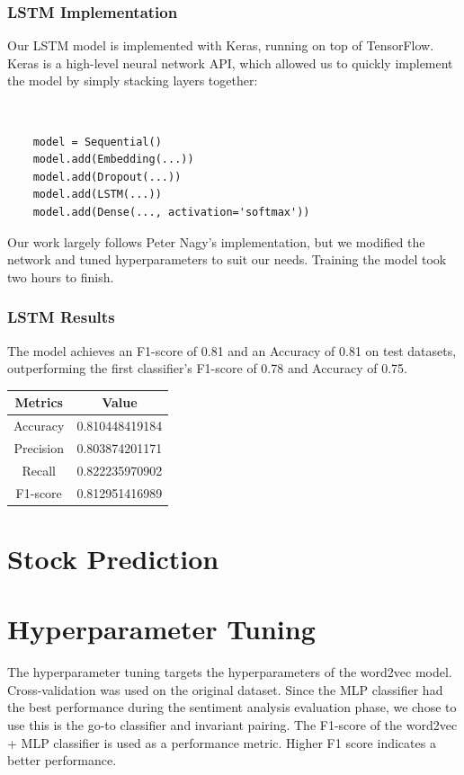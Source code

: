 \documentclass[11pt,a4paper]{article}
\begin{document}
\subsubsection{LSTM Implementation}
Our LSTM model is implemented with Keras, running on top of TensorFlow. Keras is a high-level neural network API, which allowed us to quickly implement the model by simply stacking layers together:
{\tt \small
	\begin{verbatim}
	model = Sequential()
	model.add(Embedding(...))
	model.add(Dropout(...))
	model.add(LSTM(...))
	model.add(Dense(..., activation='softmax'))
	\end{verbatim}
}

Our work largely follows Peter Nagy's implementation\cite{peter}, but we modified the network and tuned hyperparameters to suit our needs. Training the model took two hours to finish.

\subsubsection{LSTM Results}
The model achieves an F1-score of 0.81 and an Accuracy of 0.81 on test datasets, outperforming the first classifier's F1-score of 0.78 and Accuracy of 0.75.  \\

\begin{center}
	\begin{tabular}{|c|c|}
		
		\hline
		Metrics & Value \\
		\hline
		Accuracy & 0.810448419184 \\
		Precision & 0.803874201171 \\
		Recall & 0.822235970902 \\
		F1-score & 0.812951416989 \\
		\hline
	\end{tabular}
\end{center}



\section{Stock Prediction} 


\section{Hyperparameter Tuning}
The hyperparameter tuning targets the hyperparameters of the word2vec model. Cross-validation was used on the original dataset. Since the MLP classifier had the best performance during the sentiment analysis evaluation phase, we chose to use this is the go-to classifier and invariant pairing. The F1-score of the word2vec + MLP classifier is used as a performance metric. Higher F1 score indicates a better performance. 
\end{document}
